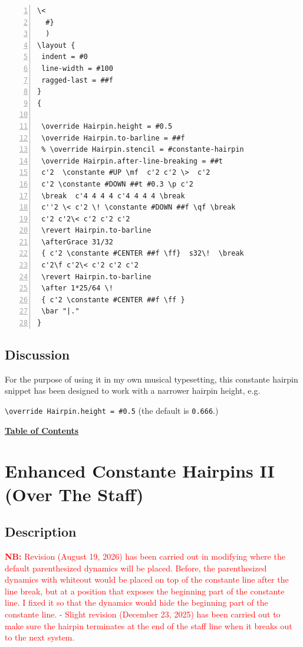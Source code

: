 \begin{Verbatim}[numbers=left,xleftmargin=5mm]
   \<
  #}
  )
\layout {
 indent = #0
 line-width = #100
 ragged-last = ##f
}
{

 \override Hairpin.height = #0.5
 \override Hairpin.to-barline = ##f
 % \override Hairpin.stencil = #constante-hairpin
 \override Hairpin.after-line-breaking = ##t
 c'2  \constante #UP \mf  c'2 c'2 \>  c'2
 c'2 \constante #DOWN ##t #0.3 \p c'2
 \break  c'4 4 4 4 c'4 4 4 4 \break
 c''2 \< c'2 \! \constante #DOWN ##f \qf \break
 c'2 c'2\< c'2 c'2 c'2
 \revert Hairpin.to-barline
 \afterGrace 31/32
 { c'2 \constante #CENTER ##f \ff}  s32\!  \break
 c'2\f c'2\< c'2 c'2 c'2
 \revert Hairpin.to-barline
 \after 1*25/64 \!
 { c'2 \constante #CENTER ##f \ff }
 \bar "|."
}

\end{Verbatim}
\subsection{Discussion}

For the purpose of using it in my own musical typesetting, this constante hairpin snippet has been designed to work with a narrower hairpin height, e.g.

\verb|\override Hairpin.height = #0.5| (the default is \verb|0.666|.)

\hyperref[sec:toc]{\textbf{Table of Contents}}
\vfill \break






\section {Enhanced Constante Hairpins II (Over The Staff)}
\label{sec:enhanced_constante_hairpins_2}
\hfill
{}
\hfill

\subsection{Description}

\textcolor{red}{\textbf{NB: } Revision (August 19, 2026) has been carried out in modifying where the default parenthesized dynamics will be placed. Before, the parenthesized dynamics with whiteout would be placed on top of the constante line after the line break, but at a position that exposes the beginning part of the constante line. I fixed it so that the dynamics would hide the beginning part of the constante line.  
- Slight revision (December 23, 2025) has been carried out to make sure the hairpin terminates at the end of the staff line when it breaks out to the next system. }

